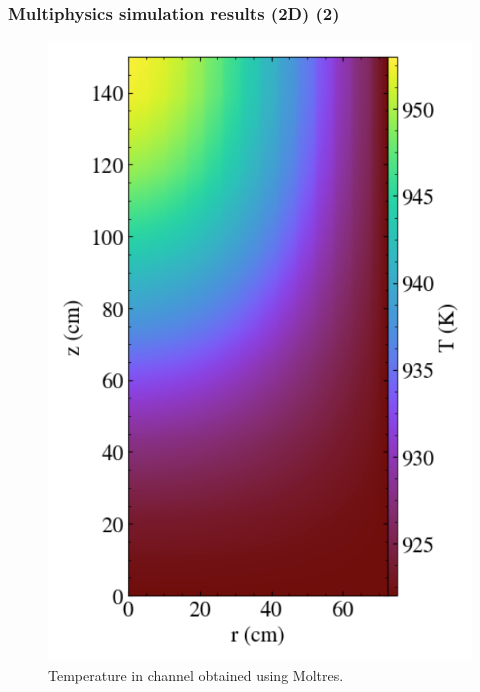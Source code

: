 \begin{frame}
  \frametitle{Multiphysics simulation results (2D) (2)}
  \begin{figure}[t]
   \vspace{-0.05in}
   \hspace*{-0.15in}
   \includegraphics[height=0.9\textheight]{./images/moltres_temp.png}
   \vspace{-0.1in}
   \caption{Temperature in channel obtained using Moltres.}
    \end{figure}

\end{frame}


